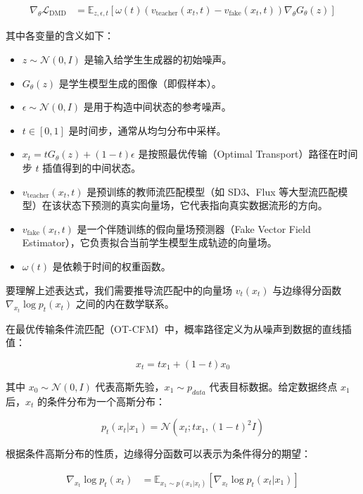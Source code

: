 \[
\begin{aligned}
\nabla_\theta\mathcal{L}_{\mathrm{DMD}}
&=
\mathbb{E}_{z,\epsilon,t}\left[
\omega(t)
\left(v_{\mathrm{teacher}}(x_t,t)-v_{\mathrm{fake}}(x_t,t)\right)
\nabla_\theta G_\theta(z)
\right]
\end{aligned}
\]

其中各变量的含义如下：

\begin{itemize}
\tightlist
\item
  \(z\sim\mathcal{N}(0,I)\) 是输入给学生生成器的初始噪声。
\item
  \(G_\theta(z)\) 是学生模型生成的图像（即假样本）。
\item
  \(\epsilon\sim\mathcal{N}(0,I)\) 是用于构造中间状态的参考噪声。
\item
  \(t\in[0,1]\) 是时间步，通常从均匀分布中采样。
\item
  \(x_t=tG_\theta(z)+(1-t)\epsilon\) 是按照最优传输（Optimal Transport）路径在时间步 \(t\) 插值得到的中间状态。
\item
  \(v_{\mathrm{teacher}}(x_t,t)\) 是预训练的教师流匹配模型（如 SD3、Flux 等大型流匹配模型）在该状态下预测的真实向量场，它代表指向真实数据流形的方向。
\item
  \(v_{\mathrm{fake}}(x_t,t)\) 是一个伴随训练的假向量场预测器（Fake Vector Field Estimator），它负责拟合当前学生模型生成轨迹的向量场。
\item
  \(\omega(t)\) 是依赖于时间的权重函数。
\end{itemize}

要理解上述表达式，我们需要推导流匹配中的向量场 \(v_t(x_t)\) 与边缘得分函数 \(\nabla_{x_t}\log p_t(x_t)\) 之间的内在数学联系。

在最优传输条件流匹配（OT-CFM）中，概率路径定义为从噪声到数据的直线插值：

\[
x_t=t x_1+(1-t)x_0
\]

其中 \(x_0\sim\mathcal{N}(0,I)\) 代表高斯先验，\(x_1\sim p_{data}\) 代表目标数据。给定数据终点 \(x_1\) 后，\(x_t\) 的条件分布为一个高斯分布：

\[
p_t(x_t|x_1)=\mathcal{N}\left(x_t;t x_1,(1-t)^2I\right)
\]

根据条件高斯分布的性质，边缘得分函数可以表示为条件得分的期望：

\[
\begin{aligned}
\nabla_{x_t}\log p_t(x_t)
&=
\mathbb{E}_{x_1\sim p(x_1|x_t)}
\left[
\nabla_{x_t}\log p_t(x_t|x_1)
\right]
\end{aligned}
\]

